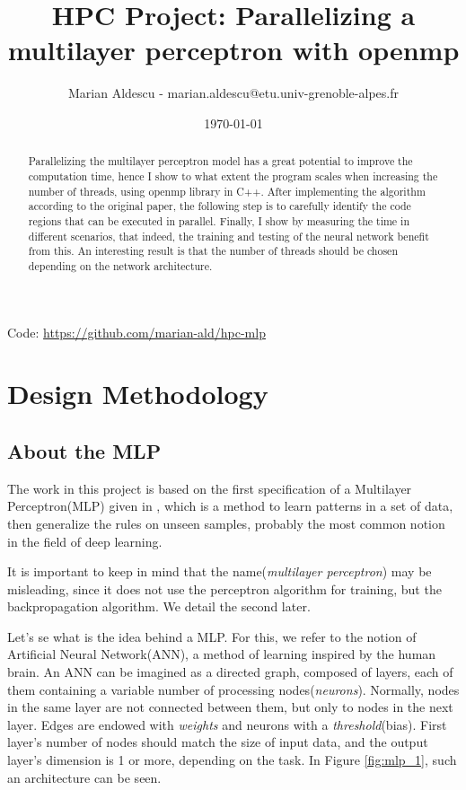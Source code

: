 \documentclass{article}
\title{HPC Project: Parallelizing a multilayer perceptron with openmp}
\author{Marian Aldescu - marian.aldescu@etu.univ-grenoble-alpes.fr}
\date{\today}
\begin{document}
	\maketitle
	
	\begin{abstract}
		Parallelizing the multilayer perceptron model has a great potential to improve the computation time, hence I show to what extent the program scales when increasing the number of threads, using openmp library in C++. After implementing the algorithm according to the original paper, the following step is to carefully identify the code regions  that can be executed in parallel. Finally, I show by measuring the time in different scenarios, that indeed, the training and testing of the neural network benefit from this. An interesting result is that the number of threads should be chosen depending on the network architecture.		
		
	\end{abstract}

Code: \url{https://github.com/marian-ald/hpc-mlp}
	
	\section{Design Methodology}
	
	
	\subsection{About the MLP}
	
	The work in this project is based on the first specification of a Multilayer Perceptron(MLP) given in \cite{rumelhart}, which is a method to learn patterns in a set of data, then generalize the rules on unseen samples, probably the most common notion in the field of deep learning.
	
	It is important to keep in mind that the name(\textit{multilayer perceptron}) may be misleading, since it does not use the perceptron algorithm for training, but the backpropagation algorithm. We detail the second later.
	
	
	Let's se what is the idea behind a MLP. For this, we refer to the notion of Artificial Neural Network(ANN), a method of learning inspired by the human brain. An ANN can be imagined as a directed graph, composed of layers, each of them containing a variable number of processing nodes(\textit{neurons}). Normally, nodes in the same layer are not connected between them, but only to nodes in the next layer. Edges are endowed with \textit{weights} and neurons with a \textit{threshold}(bias). First layer's number of nodes should match the size of input data, and the output layer's dimension is 1 or more, depending on the task. In Figure \ref{fig:mlp_1}, such an architecture can be seen.
	
\end{document}
